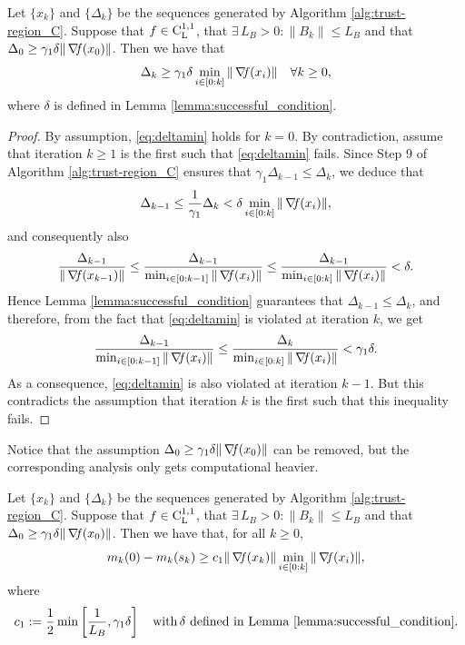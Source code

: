 \documentclass[10pt,a4paper]{article}
\begin{document}
\begin{lemma}\label{lemma:deltamin}
	Let $\{x_k\}$ and $\{\Delta_k\}$ be the sequences generated by Algorithm \ref{alg:trust-region_C}. Suppose that $f\in \mathord{\mathrm{C^{1,1}_{L}}}$, that $\exists\, L_B>0: \|B_k\| \leq L_B$ and that $\Delta_0\geq \gamma_1 \delta \|\operatorname*{\mathit{\nabla \!f}}(x_0)\|$. Then we have that
	\begin{equation}\label{eq:deltamin}
		\Delta_k \geq \gamma_1 \delta \min_{i \in [0:k]} \|\operatorname*{\mathit{\nabla \!f}}(x_i)\| \quad \forall k\geq 0,
	\end{equation}
	where $\delta$ is defined in Lemma \ref{lemma:successful_condition}.
\end{lemma}
\begin{proof}
By assumption, \eqref{eq:deltamin} holds for $k = 0$. By contradiction, assume that iteration $k \geq 1$ is the first such that \eqref{eq:deltamin} fails. Since Step 9 of Algorithm \ref{alg:trust-region_C} ensures that $\gamma_1 \Delta_{k-1} \leq \Delta_k$, we deduce that
\begin{equation*}
	\Delta_{k-1} \leq \frac{1}{\gamma_1}\Delta_k < \delta \min_{i \in [0:k]} \|\operatorname*{\mathit{\nabla \!f}}(x_i)\|,
\end{equation*}
and consequently also
\begin{equation*}
	\frac{\Delta_{k-1}}{\|\operatorname*{\mathit{\nabla \!f}}(x_{k-1})\|} \leq \frac{\Delta_{k-1}}{\min_{i \in [0:k-1]} \|\operatorname*{\mathit{\nabla \!f}}(x_i)\|} \leq \frac{\Delta_{k-1}}{\min_{i \in [0:k]} \|\operatorname*{\mathit{\nabla \!f}}(x_i)\|} < \delta.
\end{equation*}
Hence Lemma \ref{lemma:successful_condition} guarantees that $\Delta_{k-1} \leq \Delta_k$, and therefore, from the fact that \eqref{eq:deltamin} is violated at iteration $k$, we get
\begin{equation*}
	\frac{\Delta_{k-1}}{\min_{i \in [0:k-1]} \|\operatorname*{\mathit{\nabla \!f}}(x_i)\|} \leq \frac{\Delta_k}{\min_{i \in [0:k]} \|\operatorname*{\mathit{\nabla \!f}}(x_i)\|} < \gamma_1 \delta.
\end{equation*}
As a consequence, \eqref{eq:deltamin} is also violated at iteration $k - 1$. But this contradicts the assumption that iteration $k$ is the first such that this inequality fails. 
\end{proof}
\noindent Notice that the assumption $\Delta_0\geq \gamma_1 \delta \|\operatorname*{\mathit{\nabla \!f}}(x_0)\|$ can be removed, but the corresponding analysis only gets computational heavier.

\begin{lemma}\label{lemma:model_decrease2}
	Let $\{x_k\}$ and $\{\Delta_k\}$ be the sequences generated by Algorithm \ref{alg:trust-region_C}. Suppose that $f\in \mathord{\mathrm{C^{1,1}_{L}}}$, that $\exists\, L_B>0: \|B_k\| \leq L_B$ and that $\Delta_0\geq \gamma_1 \delta \|\operatorname*{\mathit{\nabla \!f}}(x_0)\|$. Then we have that, for all $k \geq 0$,
	\begin{equation*}
		m_k(0) - m_k(s_k) \geq c_1 \|\operatorname*{\mathit{\nabla \!f}}(x_k)\| \min_{i \in [0:k]} \|\operatorname*{\mathit{\nabla \!f}}(x_i)\|,
	\end{equation*}
	where
	\begin{equation*}
		c_1 := \frac{1}{2} \min \left[ \frac{1}{L_B}, \gamma_1\delta \right] \quad \mathord{\mathrm{with }}\, \delta \text{ defined in Lemma \ref{lemma:successful_condition}}.
	\end{equation*}
\end{lemma}
\end{document}
